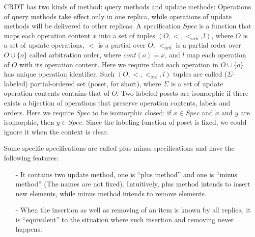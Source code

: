 CRDT has two kinds of method: query methods and update methods: Operations of query methods take effect only in one replica, while operations of update methods will be delivered to other replicas. A specification $Spec$ is a function that maps each operation content $x$ into a set of tuples $(O,<,<_{\textit{arb}},l)$, where {\color {red}$O$ is a set of update operations}, $<$ is a partial over $O$, {\color {red}$<_{\textit{arb}}$ is a partial order over $O \cup \{ o \}$ called arbitration order, where $cont(o)=x$}, and $l$ map each operation of $O$ with its operation content. 
Here we require that each operation in $O \cup \{ o \}$ has unique operation identifier. Such $(O,<,<_{\textit{arb}},l)$ tuples are called ($\Sigma$-labeled) partial-ordered set (poset, for short), where $\Sigma$ is a set of update operation contents contains that of $O$. Two labeled posets are isomorphic if there exists a bijection of operations that preserve operation contents, labels and orders. Here we require $Spec$ to be isomorphic closed: if $x \in Spec$ and $x$ and $y$ are isomorphic, then $y \in Spec$. Since the labeling function of poset is fixed, we could ignore it when the context is clear.






Some specific specifications are called plus-minus specifications and have the following features:

\begin{itemize}
\setlength{\itemsep}{0.5pt}
\item[-] It contains two update method, one is ``plus method'' and one is ``minus method'' (The names are not fixed). Intuitively, plus method intends to insert new elements, while minus method intends to remove elements.

\item[-] When the insertion as well as removing of an item is known by all replica, it is ``equivalent'' to the situation where such insertion and removing never happens.
\end{itemize}

